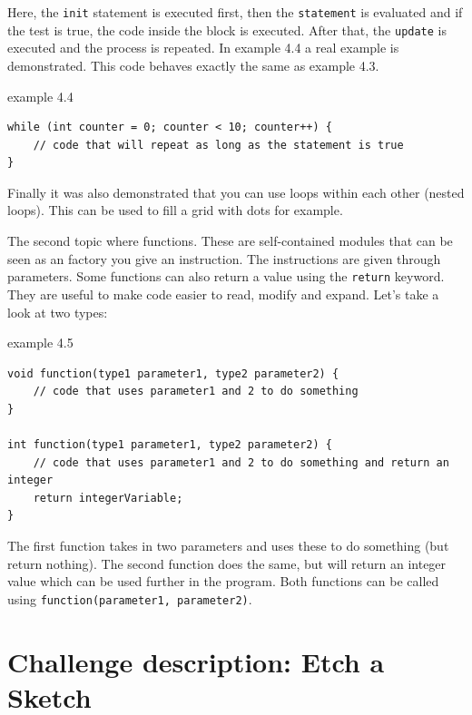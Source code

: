 Here, the \texttt{init} statement is executed first, then the \texttt{statement} is evaluated and if the test is true, the code inside the block is executed. After that, the \texttt{update} is executed and the process is repeated. In example 4.4 a real example is demonstrated. This code behaves exactly the same as example 4.3.

\begin{codebox}{example 4.4}
    \begin{lstlisting}
while (int counter = 0; counter < 10; counter++) {
    // code that will repeat as long as the statement is true
}
    \end{lstlisting}
\end{codebox}

Finally it was also demonstrated that you can use loops within each other (nested loops). This can be used to fill a grid with dots for example.

\medskip

The second topic where functions. These are self-contained modules that can be seen as an factory you give an instruction. The instructions are given through parameters. Some functions can also return a value using the \texttt{return} keyword. They are useful to make code easier to read, modify and expand. Let's take a look at two types:

\begin{codebox}{example 4.5}
    \begin{lstlisting}
void function(type1 parameter1, type2 parameter2) {
    // code that uses parameter1 and 2 to do something
}

int function(type1 parameter1, type2 parameter2) {
    // code that uses parameter1 and 2 to do something and return an integer
    return integerVariable;
}
    \end{lstlisting}
\end{codebox}

The first function takes in two parameters and uses these to do something (but return nothing). The second function does the same, but will return an integer value which can be used further in the program. Both functions can be called using \texttt{function(parameter1, parameter2)}.

\newpage

\section{Challenge description: Etch a Sketch}

